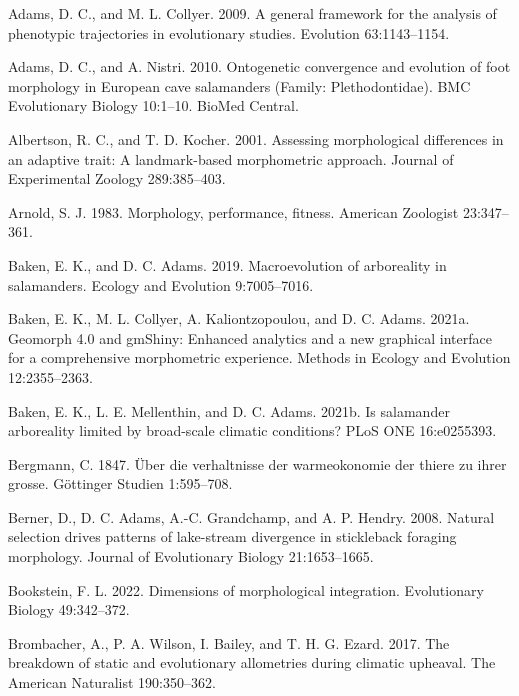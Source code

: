 \documentclass[
  11pt,
]{article}
\begin{document}
\setlength{\parindent}{-0.25in} \setlength{\leftskip}{0.25in}
\setlength{\parskip}{8pt} \noindent

\hypertarget{refs}{}
\leavevmode\hypertarget{ref-AdamsCollyer2009}{}%
Adams, D. C., and M. L. Collyer. 2009. A general framework for the
analysis of phenotypic trajectories in evolutionary studies. Evolution
63:1143--1154.

\leavevmode\hypertarget{ref-AdamsNistri2010}{}%
Adams, D. C., and A. Nistri. 2010. Ontogenetic convergence and evolution
of foot morphology in European cave salamanders (Family:
Plethodontidae). BMC Evolutionary Biology 10:1--10. BioMed Central.

\leavevmode\hypertarget{ref-Albertson2001}{}%
Albertson, R. C., and T. D. Kocher. 2001. Assessing morphological
differences in an adaptive trait: A landmark-based morphometric
approach. Journal of Experimental Zoology 289:385--403.

\leavevmode\hypertarget{ref-Arnold1983}{}%
Arnold, S. J. 1983. Morphology, performance, fitness. American Zoologist
23:347--361.

\leavevmode\hypertarget{ref-Baken2019}{}%
Baken, E. K., and D. C. Adams. 2019. Macroevolution of arboreality in
salamanders. Ecology and Evolution 9:7005--7016.

\leavevmode\hypertarget{ref-Baken2021}{}%
Baken, E. K., M. L. Collyer, A. Kaliontzopoulou, and D. C. Adams. 2021a.
Geomorph 4.0 and gmShiny: Enhanced analytics and a new graphical
interface for a comprehensive morphometric experience. Methods in
Ecology and Evolution 12:2355--2363.

\leavevmode\hypertarget{ref-Baken2021a}{}%
Baken, E. K., L. E. Mellenthin, and D. C. Adams. 2021b. Is salamander
arboreality limited by broad-scale climatic conditions? PLoS ONE
16:e0255393.

\leavevmode\hypertarget{ref-Bergmann1847}{}%
Bergmann, C. 1847. Über die verhaltnisse der warmeokonomie der thiere zu
ihrer grosse. Göttinger Studien 1:595--708.

\leavevmode\hypertarget{ref-BERNER2008}{}%
Berner, D., D. C. Adams, A.-C. Grandchamp, and A. P. Hendry. 2008.
Natural selection drives patterns of lake-stream divergence in
stickleback foraging morphology. Journal of Evolutionary Biology
21:1653--1665.

\leavevmode\hypertarget{ref-Bookstein2022}{}%
Bookstein, F. L. 2022. Dimensions of morphological integration.
Evolutionary Biology 49:342--372.

\leavevmode\hypertarget{ref-Brombacher2017}{}%
Brombacher, A., P. A. Wilson, I. Bailey, and T. H. G. Ezard. 2017. The
breakdown of static and evolutionary allometries during climatic
upheaval. The American Naturalist 190:350--362.
\end{document}
